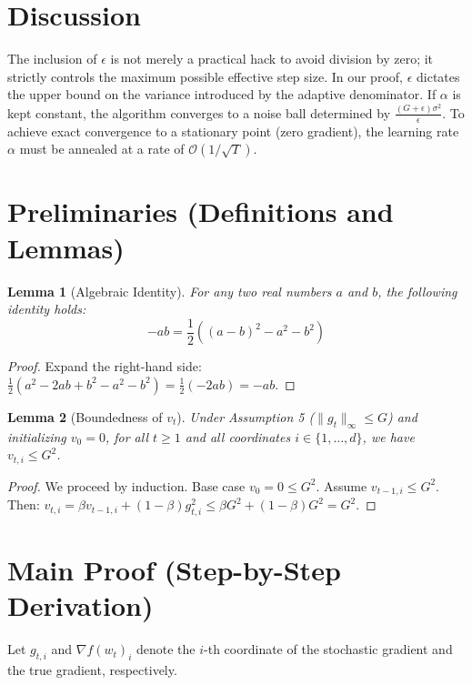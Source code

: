 \documentclass[11pt]{article}
\newtheorem{lemma}{Lemma}
\begin{document}
\section*{Discussion}
The inclusion of $\epsilon$ is not merely a practical hack to avoid division by zero; it strictly controls the maximum possible effective step size. In our proof, $\epsilon$ dictates the upper bound on the variance introduced by the adaptive denominator. If $\alpha$ is kept constant, the algorithm converges to a noise ball determined by $\frac{(G+\epsilon)\sigma^2}{\epsilon}$. To achieve exact convergence to a stationary point (zero gradient), the learning rate $\alpha$ must be annealed at a rate of $\mathcal{O}(1/\sqrt{T})$.

\section*{Preliminaries (Definitions and Lemmas)}

\begin{lemma}[Algebraic Identity]
For any two real numbers $a$ and $b$, the following identity holds:
\begin{equation*}
    -a b = \frac{1}{2} \left( (a - b)^2 - a^2 - b^2 \right)
\end{equation*}
\end{lemma}
\begin{proof}
Expand the right-hand side: $\frac{1}{2}(a^2 - 2ab + b^2 - a^2 - b^2) = \frac{1}{2}(-2ab) = -ab$.
\end{proof}

\begin{lemma}[Boundedness of $v_t$]
Under Assumption 5 ($\|g_t\|_\infty \leq G$) and initializing $v_0 = 0$, for all $t \geq 1$ and all coordinates $i \in \{1, \dots, d\}$, we have $v_{t,i} \leq G^2$.
\end{lemma}
\begin{proof}
We proceed by induction. Base case $v_0 = 0 \leq G^2$. Assume $v_{t-1,i} \leq G^2$. Then:
$v_{t,i} = \beta v_{t-1,i} + (1-\beta)g_{t,i}^2 \leq \beta G^2 + (1-\beta)G^2 = G^2$.
\end{proof}

\section*{Main Proof (Step-by-Step Derivation)}

Let $g_{t,i}$ and $\nabla f(w_t)_i$ denote the $i$-th coordinate of the stochastic gradient and the true gradient, respectively.
\end{document}
